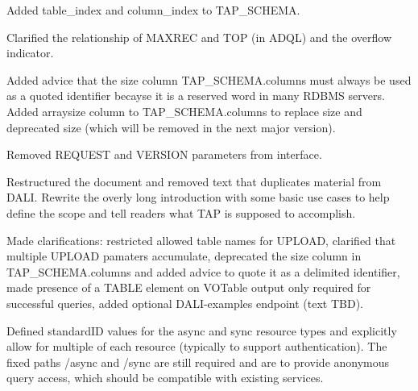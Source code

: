 \documentclass[11pt,letter]{ivoa}
\begin{document}
Added table\_index and column\_index to TAP\_SCHEMA.

Clarified the relationship of MAXREC and TOP (in ADQL) and the overflow 
indicator.

Added advice that the size column TAP\_SCHEMA.columns must always be used 
as a quoted identifier becayse it is a reserved word in many RDBMS 
servers. Added arraysize column to TAP\_SCHEMA.columns to replace size and 
deprecated size (which will be removed in the next major version).
 
Removed REQUEST and VERSION parameters from interface.

Restructured the document and removed text that duplicates material from DALI. 
Rewrite the overly long introduction with some basic use cases to help define 
the scope and tell readers what TAP is supposed to accomplish.

Made clarifications: restricted allowed table names for UPLOAD, clarified that 
multiple UPLOAD pamaters accumulate, deprecated the size column in 
TAP\_SCHEMA.columns and added advice to quote it as a delimited 
identifier, made presence of a TABLE element on VOTable output only required for 
successful queries, added optional DALI-examples endpoint (text TBD).

Defined standardID values for the async and sync resource types and explicitly 
allow for multiple of each resource (typically to support authentication). The 
fixed paths /async and /sync are still required and are to provide anonymous 
query access, which should be compatible with existing services.


\end{document}
